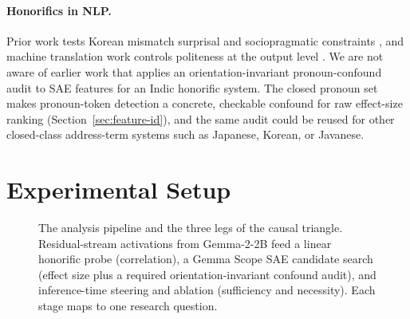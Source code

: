 \documentclass[11pt]{article}
\begin{document}
\paragraph{Honorifics in NLP.}
Prior work tests Korean mismatch surprisal \citep{noh2024honorific} and
sociopragmatic constraints \citep{cho2026deference}, and machine translation
work controls politeness at the output level \citep{sennrich2016controlling}.
We are not aware of earlier work that applies an orientation-invariant
pronoun-confound audit to SAE features for an Indic honorific system. The
closed pronoun set makes pronoun-token detection a concrete, checkable
confound for raw effect-size ranking (Section~\ref{sec:feature-id}), and the
same audit could be reused for other closed-class address-term systems such as
Japanese, Korean, or Javanese.

\section{Experimental Setup}
\label{sec:method}

\begin{figure}[t]
\centering
{}
\caption{The analysis pipeline and the three legs of the causal triangle.
  Residual-stream activations from Gemma-2-2B feed a linear honorific probe
  (correlation), a Gemma Scope SAE candidate search (effect size plus a required
  orientation-invariant confound audit), and inference-time steering and ablation
  (sufficiency and necessity). Each stage maps to one research question.}
\label{fig:pipeline}
\end{figure}
\end{document}
